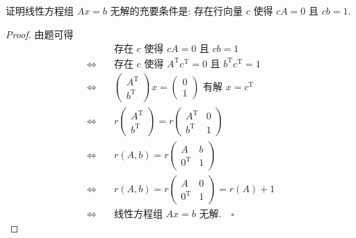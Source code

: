 \documentclass[../../main.tex]{subfiles}%
\begin{document}
\begin{example}
证明线性方程组 \(Ax = b\) 无解的充要条件是: 存在行向量 \(c\) 使得 \(cA = 0\) 且 \(cb = 1\).
\end{example}
\begin{proof}
由题可得
\begin{align*}
& \text{存在 } c \text{ 使得 } cA = 0 \text{ 且 } cb = 1 \\
\Longleftrightarrow \quad & \text{存在 } c \text{ 使得 } A^\mathrm{T} c^\mathrm{T} = 0 \text{ 且 } b^\mathrm{T} c^\mathrm{T} = 1 \\
\Longleftrightarrow \quad & \begin{pmatrix} A^\mathrm{T} \\ b^\mathrm{T} \end{pmatrix} x = \begin{pmatrix} 0 \\ 1 \end{pmatrix} \text{ 有解 } x = c^\mathrm{T} \\
\Longleftrightarrow \quad & r \begin{pmatrix} A^\mathrm{T} \\ b^\mathrm{T} \end{pmatrix} = r \begin{pmatrix} A^\mathrm{T} & 0 \\ b^\mathrm{T} & 1 \end{pmatrix} \\
\Longleftrightarrow \quad & r(A, b) = r \begin{pmatrix} A & b \\ 0^\mathrm{T} & 1 \end{pmatrix} \\
\Longleftrightarrow \quad & r(A, b) = r \begin{pmatrix} A & 0 \\ 0^\mathrm{T} & 1 \end{pmatrix} = r(A) + 1 \\
\Longleftrightarrow \quad & \text{线性方程组 } Ax = b \text{ 无解.} \quad \square
\end{align*}
\end{proof}
\end{document}
